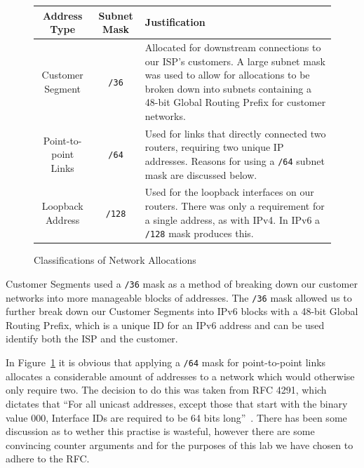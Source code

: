 \begin{figure}[!ht]
    \caption{Classifications of Network Allocations}
    \label{figure:network-alloc-3}
    \centering
    \begin{tabular}{|c|c|p{5.5cm}|}

        \hline \textbf{Address Type} & \textbf{Subnet Mask} & \textbf{Justification} \\

        \hline
        Customer Segment & \texttt{/36} & Allocated for downstream connections
        to our ISP's customers. A large subnet mask was used to allow for
        allocations to be broken down into subnets containing a 48-bit Global
        Routing Prefix for customer networks.\\

        \hline
        Point-to-point Links & \texttt{/64} & Used for links that directly
        connected two routers, requiring two unique IP addresses. Reasons for
        using a \texttt{/64} subnet mask are discussed below.\\
        \hline
        Loopback Address & \texttt{/128} & Used for the loopback interfaces on
        our routers. There was only a requirement for a single address, as with
        IPv4. In IPv6 a \texttt{/128} mask produces this.\\

        \hline
    \end{tabular}
\end{figure}

Customer Segments used a \texttt{/36} mask as a method of breaking down our
customer networks into more manageable blocks of addresses. The \texttt{/36}
mask allowed us to further break down our Customer Segments into IPv6 blocks
with a 48-bit Global Routing Prefix, which is a unique ID for an IPv6 address
and can be used identify both the ISP and the customer.

In Figure~\ref{figure:network-alloc-3} it is obvious that applying a
\texttt{/64} mask for point-to-point links allocates a considerable amount of
addresses to a network which would otherwise only require two. The decision to
do this was taken from RFC 4291, which dictates that ``For all unicast
addresses, except those that start with the binary value 000, Interface IDs are
required to be 64 bits long''~\cite{rfc4291}. There has been some discussion as
to wether this practise is wasteful\cite{ipv6waste}, however there are
some convincing counter arguments\cite{ipv6notwaste} and for the purposes of
this lab we have chosen to adhere to the RFC.
